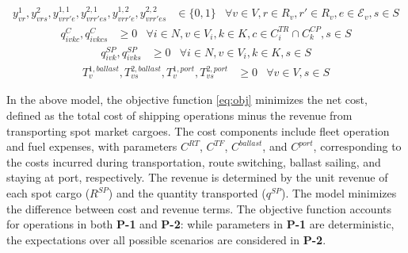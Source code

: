 \documentclass[11pt,english]{article}
\begin{document}
\begin{align} 
    y_{vr}^1, y_{vrs}^2, y_{vrr'e}^{1,1}, y_{vrr'es}^{2,1}, y_{vrr'e}^{1,2}, y_{vrr'es}^{2,2} &\in \{0, 1\} & \forall v \in V, r \in R_v, r' \in R_v, e\in \mathcal{E}_v, s \in S
    \label{eq:variable_2}
\end{align}
\begin{align}
    q_{ivkc}^{C}, q_{ivkcs}^{C} &\geq 0  & \forall i\in N, v \in V_i, k \in K, c\in C_i^{TR}\cap C_k^{CP}, s \in S \label{eq:variable_3}
\end{align}
\begin{align}
    q_{ivk}^{SP}, q_{ivks}^{SP} &\geq 0  & \forall i\in N, v \in V_i, k \in K, s \in S \label{eq:variable_4}
\end{align}
\begin{align}
    T_{v}^{1,ballast}, T_{vs}^{2,ballast}, T_{v}^{1,port}, T_{vs}^{2,port} &\geq 0  & \forall v \in V, s \in S \label{eq:variable_5}
\end{align}

In the above model, the objective function \eqref{eq:obj} minimizes the net cost, defined as the total cost of shipping operations minus the revenue from transporting spot market cargoes. The cost components include fleet operation and fuel expenses, with parameters $C^{RT}$, $C^{TF}$, $C^{ballast}$, and $C^{port}$, corresponding to the costs incurred during transportation, route switching, ballast sailing, and staying at port, respectively. The revenue is determined by the unit revenue of each spot cargo ($R^{SP}$) and the quantity transported ($q^{SP}$). The model minimizes the difference between cost and revenue terms. The objective function accounts for operations in both \textbf{P-1} and \textbf{P-2}: while parameters in \textbf{P-1} are deterministic, the expectations over all possible scenarios are considered in \textbf{P-2}.
\end{document}
